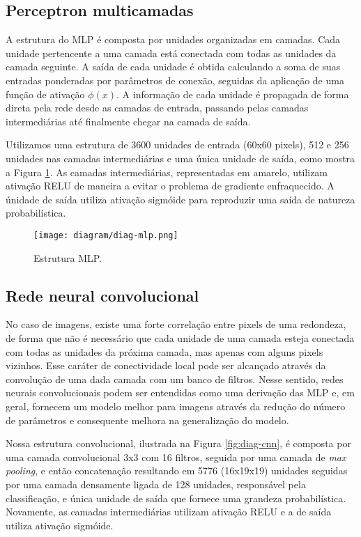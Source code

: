     \subsection{Perceptron multicamadas}
        A estrutura do MLP é composta por unidades organizadas em camadas. Cada unidade pertencente a uma camada está conectada com todas as unidades da camada seguinte. A saída de cada unidade é obtida calculando a soma de suas entradas ponderadas por parâmetros de conexão, seguidas da aplicação de uma função de ativação $\phi(x)$. A informação de cada unidade é propagada de forma direta pela rede desde as camadas de entrada, passando pelas camadas intermediárias até finalmente chegar na camada de saída.

        Utilizamos uma estrutura de 3600 unidades de entrada (60x60 pixels), 512 e 256 unidades nas camadas intermediárias e uma única unidade de saída, como mostra a Figura \ref{fig:diag-mlp}. As camadas intermediárias, representadas em amarelo, utilizam ativação RELU \cite{nair2010relu} de maneira a evitar o problema de gradiente enfraquecido. A únidade de saída utiliza ativação sigmóide para reproduzir uma saída de natureza probabilística.

        \begin{figure}
        \centering
        \texttt{[image: diagram/diag-mlp.png]}
        \caption{Estrutura MLP.}
        \label{fig:diag-mlp}
        \end{figure}

    \subsection{Rede neural convolucional}
         No caso de imagens, existe uma forte correlação entre pixels de uma redondeza, de forma que não é necessário que cada unidade de uma camada esteja conectada com todas as unidades da próxima camada, mas apenas com alguns pixels vizinhos. Esse caráter de conectividade local pode ser alcançado através da convolução de uma dada camada com um banco de filtros. Nesse sentido, redes neurais convolucionais podem ser entendidas como uma derivação das MLP e, em geral, fornecem um modelo melhor para imagens através da redução do número de parâmetros e consequente melhora na generalização do modelo.

         Nossa estrutura convolucional, ilustrada na Figura \ref{fig:diag-cnn}, é composta por uma camada convolucional 3x3 com 16 filtros, seguida por uma camada de \textit{max pooling}, e então concatenação resultando em 5776 (16x19x19) unidades seguidas por uma camada densamente ligada de 128 unidades, responsável pela classificação, e única unidade de saída que fornece uma grandeza probabilística. Novamente, as camadas intermediárias utilizam ativação RELU e a de saída utiliza ativação sigmóide.

